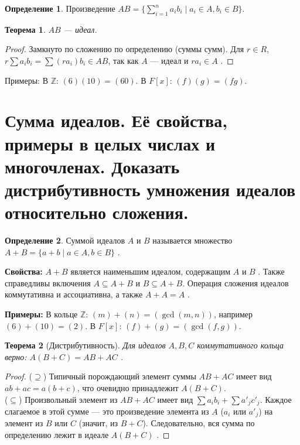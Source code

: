 \documentclass[12pt, a4paper]{article}
\theoremstyle{definition}
\newtheorem{definition}{Определение}[section]
\theoremstyle{plain}
\newtheorem{theorem}{Теорема}[section]
\begin{document}
	\begin{definition}
		Произведение $AB = \{ \sum_{i=1}^n a_i b_i \mid a_i \in A, b_i \in B \}$.
	\end{definition}
	
	\begin{theorem}
		$AB$ — идеал.
	\end{theorem}
	\begin{proof}
		Замкнуто по сложению по определению (суммы сумм). Для $r \in R$, $r \sum a_i b_i = \sum (ra_i)b_i \in AB$, так как $A$ — идеал и $ra_i \in A$ .
	\end{proof}
	
	Примеры: В $\mathbb{Z}$: $(6)(10) = (60)$. В $F[x]$: $(f)(g) = (fg)$.
	
	\newpage
	\setcounter{section}{20}
	\section{Сумма идеалов. Её свойства, примеры в целых числах и многочленах. Доказать дистрибутивность умножения идеалов относительно сложения.}
	
	\begin{definition}
		Суммой идеалов $A$ и $B$ называется множество $A+B = \{a+b \mid a \in A, b \in B\}$ .
	\end{definition}
	
	\textbf{Свойства:} $A+B$ является наименьшим идеалом, содержащим $A$ и $B$ . Также справедливы включения $A \subseteq A+B$ и $B \subseteq A+B$. Операция сложения идеалов коммутативна и ассоциативна, а также $A+A=A$ .
	
	\textbf{Примеры:} В кольце $\mathbb{Z}$: $(m)+(n) = (\gcd(m,n))$, например $(6)+(10)=(2)$. В $F[x]$: $(f)+(g) = (\gcd(f,g))$.
	
	\begin{theorem}[Дистрибутивность]
		Для идеалов $A, B, C$ коммутативного кольца верно: $A(B+C) = AB+AC$ .
	\end{theorem}
	\begin{proof}
		($\supseteq$) Типичный порождающий элемент суммы $AB+AC$ имеет вид $ab+ac = a(b+c)$, что очевидно принадлежит $A(B+C)$. \\
		($\subseteq$) Произвольный элемент из $AB+AC$ имеет вид $\sum a_i b_i + \sum a'_j c'_j$. Каждое слагаемое в этой сумме — это произведение элемента из $A$ ($a_i$ или $a'_j$) на элемент из $B$ или $C$ (значит, из $B+C$). Следовательно, вся сумма по определению лежит в идеале $A(B+C)$ .
	\end{proof}
	
\end{document}
